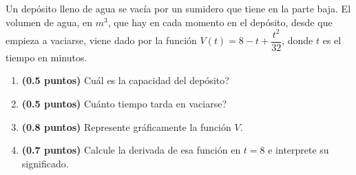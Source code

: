 
Un depósito lleno de agua se vacía por un sumidero que tiene en la parte baja. El volumen de agua, en $m^3$, que hay en cada momento en el depósito, desde que empieza a vaciarse, viene dado por la función $V(t)=8-t+\dfrac{t^2}{32}$, donde $t$ es el tiempo en minutos.
\begin{enumerate}[label=\alph*)]
\item \textbf{(0.5 puntos)} \textquestiondown{}Cuál es la capacidad del depósito?
\item \textbf{(0.5 puntos)} \textquestiondown{}Cuánto tiempo tarda en vaciarse?
\item \textbf{(0.8 puntos)} Represente gráficamente la función $V$.
\item \textbf{(0.7 puntos)} Calcule la derivada de esa función en $t=8$ e interprete su significado.
\end{enumerate}
